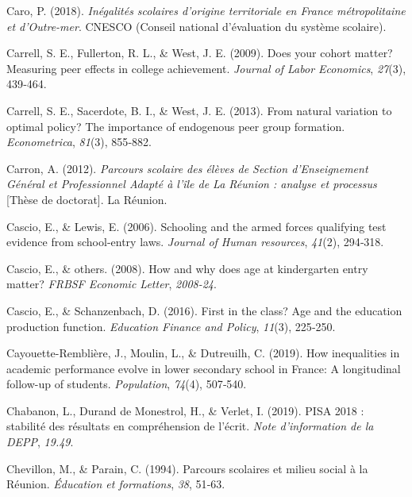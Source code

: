 \documentclass[
]{book}
\newlength{\cslhangindent}
\newlength{\cslentryspacingunit} %
\newenvironment{CSLReferences}[2] %
 {%
  \setlength{\parindent}{0pt}
  \ifodd #1
  \let\oldpar\par
  \def\par{\hangindent=\cslhangindent\oldpar}
  \fi
  \setlength{\parskip}{#2\cslentryspacingunit}
 }%
 {}
\begin{document}
\begin{CSLReferences}{1}{2}
\leavevmode{}%
Caro, P. (2018). \emph{In{é}galit{é}s scolaires d'origine territoriale en France m{é}tropolitaine et d'Outre-mer}. CNESCO (Conseil national d'évaluation du système scolaire).

\leavevmode{}%
Carrell, S. E., Fullerton, R. L., \& West, J. E. (2009). Does your cohort matter? Measuring peer effects in college achievement. \emph{Journal of Labor Economics}, \emph{27}(3), 439‑464.

\leavevmode{}%
Carrell, S. E., Sacerdote, B. I., \& West, J. E. (2013). From natural variation to optimal policy? The importance of endogenous peer group formation. \emph{Econometrica}, \emph{81}(3), 855‑882.

\leavevmode{}%
Carron, A. (2012). \emph{Parcours scolaire des élèves de Section d'Enseignement Général et Professionnel Adapté à l'île de La Réunion : analyse et processus} {[}Thèse de doctorat{]}. La Réunion.

\leavevmode{}%
Cascio, E., \& Lewis, E. (2006). Schooling and the armed forces qualifying test evidence from school-entry laws. \emph{Journal of Human resources}, \emph{41}(2), 294‑318.

\leavevmode{}%
Cascio, E., \& others. (2008). How and why does age at kindergarten entry matter? \emph{FRBSF Economic Letter}, \emph{2008-24}.

\leavevmode{}%
Cascio, E., \& Schanzenbach, D. (2016). First in the class? Age and the education production function. \emph{Education Finance and Policy}, \emph{11}(3), 225‑250.

\leavevmode{}%
Cayouette-Remblière, J., Moulin, L., \& Dutreuilh, C. (2019). How inequalities in academic performance evolve in lower secondary school in France: A longitudinal follow-up of students. \emph{Population}, \emph{74}(4), 507‑540.

\leavevmode{}%
Chabanon, L., Durand de Monestrol, H., \& Verlet, I. (2019). PISA 2018 : stabilit{é} des r{é}sultats en compr{é}hension de l'{é}crit. \emph{Note d'information de la DEPP}, \emph{19.49}.

\leavevmode{}%
Chevillon, M., \& Parain, C. (1994). Parcours scolaires et milieu social {à} la R{é}union. \emph{Éducation et formations}, \emph{38}, 51‑63.


\end{CSLReferences}
\end{document}

